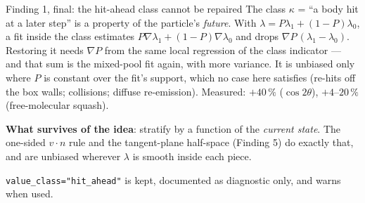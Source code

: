 \documentclass[10pt,aspectratio=169]{beamer}
\newcommand{\code}[1]{\texttt{\small #1}}
\begin{document}
\begin{frame}{Finding 1, final: the hit-ahead class cannot be repaired}
The class $\kappa$ = ``a body hit at a later step'' is a property of the particle's
\emph{future}.  With $\lambda = P\lambda_1 + (1-P)\lambda_0$, a fit inside the class estimates
$P\nabla\lambda_1 + (1-P)\nabla\lambda_0$ and drops $\nabla P\,(\lambda_1-\lambda_0)$.  Restoring
it needs $\nabla P$ from the same local regression of the class indicator --- and that sum is
the mixed-pool fit again, with more variance.  It is unbiased only where $P$ is constant over the
fit's support, which no case here satisfies (re-hits off the box walls; collisions; diffuse
re-emission).  Measured: $+40\,\%$ ($\cos2\theta$), $+4$--$20\,\%$ (free-molecular squash).

\medskip
\textbf{What survives of the idea}: stratify by a function of the \emph{current state}.  The
one-sided $v\cdot n$ rule and the tangent-plane half-space (Finding 5) do exactly that, and are
unbiased wherever $\lambda$ is smooth inside each piece.

\medskip
\code{value\_class="hit\_ahead"} is kept, documented as diagnostic only, and warns when used.
\end{frame}
\end{document}
